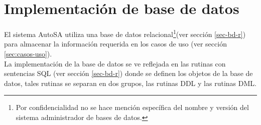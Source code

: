 

\section{Implementación de base de datos}
El sistema AutoSA utiliza una base de datos relacional\footnote{Por confidencialidad no se hace mención específica del nombre y versión del sistema administrador de bases de datos.}(ver sección \ref{sec-bd-r}) para almacenar la información requerida en los casos de uso (ver sección \ref{sec:casos-uso}).\\
La implementación de la base de datos se ve reflejada en las rutinas con sentencias SQL (ver sección \ref{sec-bd-r}) donde se definen los objetos de la base de datos, tales rutinas se separan en dos grupos, las rutinas DDL y las rutinas DML.


